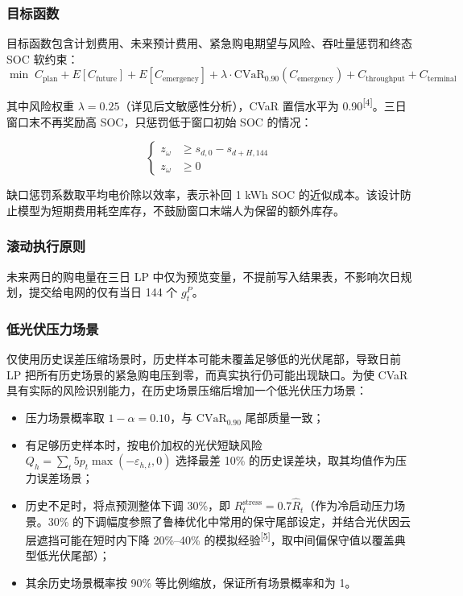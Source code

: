 \documentclass[withoutpreface,bwprint]{cumcmthesis} %
\begin{document}
\subsubsection{目标函数}

目标函数包含计划费用、未来预计费用、紧急购电期望与风险、吞吐量惩罚和终态 SOC 软约束：
\begin{equation}
    \min\; C_{\text{plan}} + E[C_{\text{future}}] + E[C_{\text{emergency}}] + \lambda \cdot \text{CVaR}_{0.90}(C_{\text{emergency}}) + C_{\text{throughput}} + C_{\text{terminal}}
    \label{eq:q2-objective}
\end{equation}

其中风险权重 $\lambda=0.25$（详见后文敏感性分析），CVaR 置信水平为 0.90\textsuperscript{[4]}。三日窗口末不再奖励高 SOC，只惩罚低于窗口初始 SOC 的情况：

\begin{equation}
	\left\{
	\begin{aligned}
    z_\omega &\ge s_{d,0}-s_{d+H,144}\\
    z_\omega &\ge 0
	\end{aligned}
	\right.
\end{equation}
\vspace{5pt}

缺口惩罚系数取平均电价除以效率，表示补回 1 kWh SOC 的近似成本。该设计防止模型为短期费用耗空库存，不鼓励窗口末端人为保留的额外库存。

\subsubsection{滚动执行原则}

未来两日的购电量在三日 LP 中仅为预览变量，不提前写入结果表，不影响次日规划，提交给电网的仅有当日 144 个 $g^P_t$。

\subsubsection{低光伏压力场景}

仅使用历史误差压缩场景时，历史样本可能未覆盖足够低的光伏尾部，导致日前 LP 把所有历史场景的紧急购电压到零，而真实执行仍可能出现缺口。为使 CVaR 具有实际的风险识别能力，在历史场景压缩后增加一个低光伏压力场景：
\begin{itemize}
    \item 压力场景概率取 $1-\alpha=0.10$，与 $\text{CVaR}_{0.90}$ 尾部质量一致；
    \item 有足够历史样本时，按电价加权的光伏短缺风险 $Q_h=\sum_t 5p_t\max(-\varepsilon_{h,t},0)$ 选择最差 10\% 的历史误差块，取其均值作为压力误差场景；
    \item 历史不足时，将点预测整体下调 30\%，即 $R_t^{\text{stress}}=0.7\hat R_t$（作为冷启动压力场景。30\% 的下调幅度参照了鲁棒优化中常用的保守尾部设定，并结合光伏因云层遮挡可能在短时内下降 20\%--40\% 的模拟经验\textsuperscript{[5]}，取中间偏保守值以覆盖典型低光伏尾部）；
    \item 其余历史场景概率按 90\% 等比例缩放，保证所有场景概率和为 1。
\end{itemize}
\end{document}
